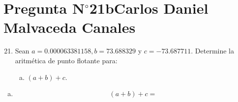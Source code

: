\section{Pregunta N$^{\circ}$21b\qquad Carlos Daniel Malvaceda Canales}

\begin{frame}
	\begin{enumerate}\setcounter{enumi}{20}
		\item

		      Sean $a=0.000063381158, b=73.688329$ y $c=-73.687711$.
		      Determine la aritmética de punto flotante para:

		      \begin{enumerate}[b)]
			      \item

			            \begin{math}
				            \left(a+b\right)+c
			            \end{math}.
		      \end{enumerate}
	\end{enumerate}

	\begin{solution}
		\begin{enumerate}[b)]
			\item

			      \begin{equation*}
				      \left(a+b\right)+c=
			      \end{equation*}
		\end{enumerate}
	\end{solution}
\end{frame}
